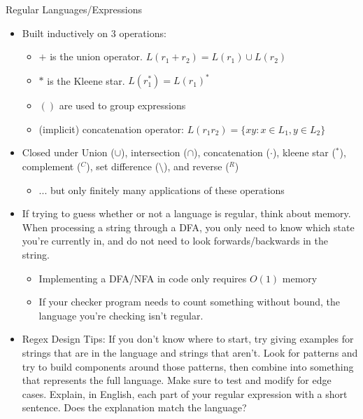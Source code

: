 \documentclass{beamer}
\begin{document}
\begin{frame}[t]{Regular Languages/Expressions}
    \begin{itemize}
        \item Built inductively on 3 operations:
        \begin{itemize}
            \item \pause $+$ is the union operator. $L(r_1 + r_2) = L(r_1) \cup L(r_2)$
            \item \pause $*$ is the Kleene star. $L(r_1^*) = L(r_1)^*$
            \item \pause $()$ are used to group expressions
            \item \pause (implicit) concatenation operator: $L(r_1r_2) = \{xy : x \in L_1, y \in L_2\}$
        \end{itemize}
        \item \pause Closed under Union ($\cup$), intersection ($\cap$), concatenation ($\cdot$), kleene star (${}^*$), complement ($^C$), set difference ($\setminus$), and reverse (${}^R$)
        \begin{itemize}
            \item \pause ... but only finitely many applications of these operations
        \end{itemize}
        \item \pause If trying to guess whether or not a language is regular, think about memory. When processing a string through a DFA, you only need to know which state you're currently in, and do not need to look forwards/backwards in the string.
        \begin{itemize}
            \item Implementing a DFA/NFA in code only requires $O(1)$ memory
            \item If your checker program needs to count something without bound, the language you're checking isn't regular.
        \end{itemize}
        \item \pause \alert{Regex Design Tips:} If you don't know where to start, try giving examples for strings that are in the language and strings that aren't. Look for patterns and try to build components around those patterns, then combine into something that represents the full language. Make sure to test and modify for edge cases. Explain, in English, each part of your regular expression with a short sentence. Does the explanation match the language?
    \end{itemize}
\end{frame}
\end{document}
